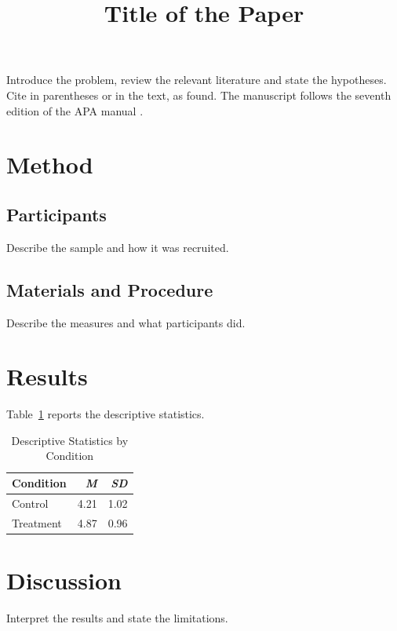 \documentclass[jou,floatsintext]{apa7}
\title{Title of the Paper}
\begin{document}
\maketitle

Introduce the problem, review the relevant literature and state the
hypotheses. Cite in parentheses \parencite{cohen1988statistical} or in the
text, as \textcite{opensciencecollaboration2015estimating} found. The
manuscript follows the seventh edition of the APA manual
\parencite{apa2020publication}.

\section{Method}
\subsection{Participants}
Describe the sample and how it was recruited.

\subsection{Materials and Procedure}
Describe the measures and what participants did.

\section{Results}
Table~\ref{tab:results} reports the descriptive statistics.

\begin{table}[htbp]
  \caption{Descriptive Statistics by Condition}
  \label{tab:results}
  \begin{tabular}{lrr}
    \toprule
    Condition & \textit{M} & \textit{SD} \\
    \midrule
    Control & 4.21 & 1.02 \\
    Treatment & 4.87 & 0.96 \\
    \bottomrule
  \end{tabular}
\end{table}

\section{Discussion}
Interpret the results and state the limitations.

\printbibliography
\end{document}
